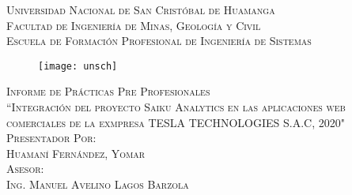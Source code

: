 \newcommand{\mydate}{\formatdate{21}{11}{2020}}
\begin{titlepage}
	\begin{center}
		\textsc{ 
		\Large Universidad Nacional de San Cristóbal de Huamanga\\
		\vspace{5mm}
			Facultad de Ingeniería de Minas, Geología y Civil\\
		\vspace{5mm}
		Escuela de Formación Profesional de Ingeniería de Sistemas\\}
	
			\begin{figure}[h]
				\centering
				\texttt{[image: unsch]}
			\end{figure}
		
		\textsc{ 
			\large Informe de Prácticas Pre Profesionales\\
			\vspace{5mm}
				``Integración del proyecto Saiku Analytics en las aplicaciones web comerciales de la exmpresa TESLA TECHNOLOGIES S.A.C, 2020"\\
			\vspace{1cm}
			Presentador Por:\\
			Huamaní Fernández, Yomar\\	
			\vspace{5mm}
			Asesor:\\
			Ing. Manuel Avelino Lagos Barzola\\
			\vspace{5mm}
			\mydate
		}
	\end{center}
\end{titlepage}